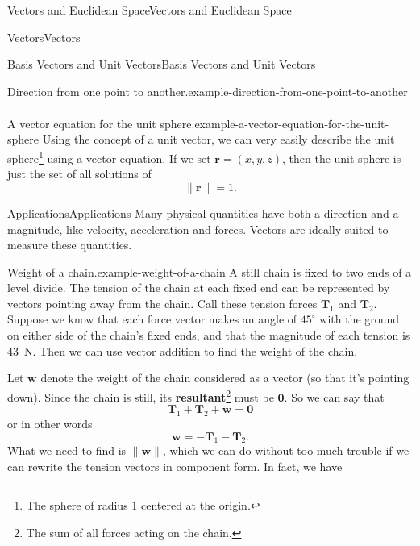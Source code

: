 \documentclass[10pt,]{book}
\newcommand{\terminology}[1]{\textbf{#1}}
\numberwithin{equation}{section}
\newcommand{\vv}[1]{\mathbf{#1}}
\begin{document}
\begin{chapterptx}{Vectors and Euclidean Space}{}{Vectors and Euclidean Space}{}{}
\begin{sectionptx}{Vectors}{}{Vectors}{}{}
\begin{subsectionptx}{Basis Vectors and Unit Vectors}{}{Basis Vectors and Unit Vectors}{}{}
\begin{example}{Direction from one point to another.}{example-direction-from-one-point-to-another}
\begin{align*}
\end{align*}
\end{example}
\begin{example}{A vector equation for the unit sphere.}{example-a-vector-equation-for-the-unit-sphere}%
\hypertarget{p-899}{}%
Using the concept of a unit vector, we can very easily describe the unit sphere\footnote{The sphere of radius \(1\) centered at the origin.\label{fn-3}} using a vector equation. If we set \(\vv{r} = (x,y,z)\), then the unit sphere is just the set of all solutions of%
%
\begin{equation*}
\|\vv{r}\| = 1.
\end{equation*}
\end{example}
\end{subsectionptx}
%
%
\typeout{************************************************}
\typeout{************************************************}
%
\begin{subsectionptx}{Applications}{}{Applications}{}{}\label{subsection-applications}
\hypertarget{p-900}{}%
Many physical quantities have both a direction and a magnitude, like velocity, acceleration and forces. Vectors are ideally suited to measure these quantities.%
\begin{example}{Weight of a chain.}{example-weight-of-a-chain}%
\hypertarget{p-901}{}%
A still chain is fixed to two ends of a level divide. The tension of the chain at each fixed end can be represented by vectors pointing away from the chain. Call these tension forces \(\vv{T}_{1}\) and \(\vv{T}_{2}\). Suppose we know that each force vector makes an angle of \(45^{\circ}\) with the ground on either side of the chain's fixed ends, and that the magnitude of each tension is \SI{43}{\newton}. Then we can use vector addition to find the weight of the chain.%
\par
\hypertarget{p-902}{}%
Let \(\vv{w}\) denote the weight of the chain considered as a vector (so that it's pointing down). Since the chain is still, its \terminology{resultant}\footnote{The sum of all forces acting on the chain.\label{fn-4}} must be \(\vv{0}\). So we can say that%
%
\begin{equation*}
\vv{T}_{1}+\vv{T}_{2} + \vv{w} = \vv{0}
\end{equation*}
\hypertarget{p-903}{}%
or in other words%
%
\begin{equation*}
\vv{w} = -\vv{T}_{1}-\vv{T}_{2}.
\end{equation*}
\hypertarget{p-904}{}%
What we need to find is \(\|\vv{w}\|\), which we can do without too much trouble if we can rewrite the tension vectors in component form. In fact, we have%

\end{example}
\end{subsectionptx}
\end{sectionptx}
\end{chapterptx}
\end{document}
